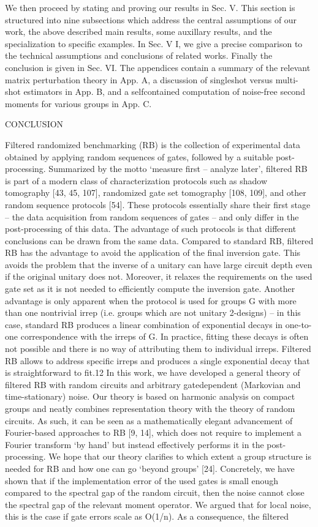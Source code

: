 We then proceed by stating and proving our results in Sec. V. This section is structured into nine subsections which address the central assumptions of our work, the above described main results, some auxillary results, and the specialization to specific examples. In Sec. V I, we give a precise comparison to the technical assumptions and conclusions of related works. Finally the conclusion is given in Sec. VI. The appendices contain a summary of the relevant matrix perturbation theory in App. A, a discussion of singleshot versus multi-shot estimators in App. B, and a selfcontained computation of noise-free second moments for various groups in App. C.

CONCLUSION 

Filtered randomized benchmarking (RB) is the collection of experimental data obtained by applying random sequences of gates, followed by a suitable post-processing. Summarized by the motto ‘measure first – analyze later’, filtered RB is part of a modern class of characterization protocols such as shadow tomography [43, 45, 107], randomized gate set tomography [108, 109], and other random sequence protocols [54]. These protocols essentially share their first stage – the data acquisition from random sequences of gates – and only differ in the post-processing of this data. The advantage of such protocols is that different conclusions can be drawn from the same data. Compared to standard RB, filtered RB has the advantage to avoid the application of the final inversion gate. This avoids the problem that the inverse of a unitary can have large circuit depth even if the original unitary does not. Moreover, it relaxes the requirements on the used gate set as it is not needed to efficiently compute the inversion gate. Another advantage is only apparent when the protocol is used for groups G with more than one nontrivial irrep (i.e. groups which are not unitary 2-designs) – in this case, standard RB produces a linear combination of exponential decays in one-to-one correspondence with the irreps of G. In practice, fitting these decays is often not possible and there is no way of attributing them to individual irreps. Filtered RB allows to address specific irreps and produces a single exponential decay that is straightforward to fit.12 In this work, we have developed a general theory of filtered RB with random circuits and arbitrary gatedependent (Markovian and time-stationary) noise. Our theory is based on harmonic analysis on compact groups and neatly combines representation theory with the theory of random circuits. As such, it can be seen as a mathematically elegant advancement of Fourier-based approaches to RB [9, 14], which does not require to implement a Fourier transform ‘by hand’ but instead effectively performs it in the post-processing. We hope that our theory clarifies to which extent a group structure is needed for RB and how one can go ‘beyond groups’ [24]. Concretely, we have shown that if the implementation error of the used gates is small enough compared to the spectral gap of the random circuit, then the noise cannot close the spectral gap of the relevant moment operator. We argued that for local noise, this is the case if gate errors scale as O(1/n). As a consequence, the filtered 